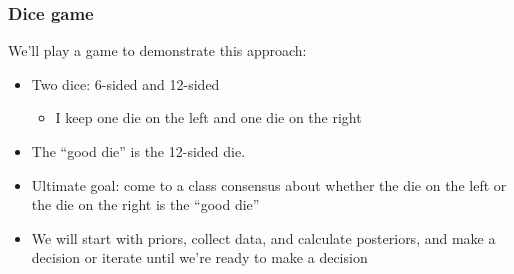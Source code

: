 \documentclass[slidestop,compress,mathserif,11pt,t,professionalfonts,xcolor=table]{beamer}
\begin{document}

\begin{frame}
\frametitle{Dice game}

We'll play a game to demonstrate this approach:

\begin{itemize}

\item Two dice: 6-sided and 12-sided
\begin{itemize}
\item I keep one die on the left and one die on the right
\end{itemize}

\pause

\item The ``good die'' is the 12-sided die.

\pause

\item Ultimate goal: come to a class consensus about whether the die on the left or the die on the right is the ``good die''

\pause

\item We will start with priors, collect data, and calculate posteriors, and make a decision or iterate until we're ready to make a decision

\end{itemize}

\end{frame}

\end{document}
